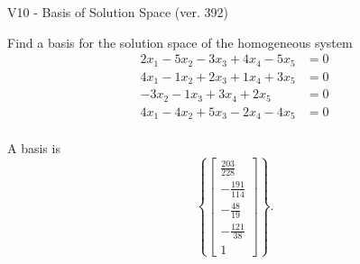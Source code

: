 \begin{exercise}
  \begin{exerciseTitle}V10 - Basis of Solution Space (ver. 392)\end{exerciseTitle}
  \begin{exerciseStatement}
    Find a basis for the solution space of the homogeneous system 
\begin{align*}
 2 x_ 1 -5 x_ 2 -3 x_ 3 + 4 x_ 4 -5 x_ 5 &= 0  \\ 
  4 x_ 1 -1 x_ 2 + 2 x_ 3 + 1 x_ 4 + 3 x_ 5 &= 0  \\ 
  -3 x_ 2 -1 x_ 3 + 3 x_ 4 + 2 x_ 5 &= 0  \\ 
  4 x_ 1 -4 x_ 2 + 5 x_ 3 -2 x_ 4 -4 x_ 5 &= 0  \\ 
 \end{align*}


 
  \end{exerciseStatement}

  \begin{exerciseAnswer}
   A basis is   
\[\left\{\left[\begin{array}{c}
\frac{203}{228} \\
-\frac{191}{114} \\
-\frac{48}{19} \\
-\frac{121}{38} \\
1
\end{array}\right]\right\}.\]

  


  \end{exerciseAnswer}
\end{exercise}